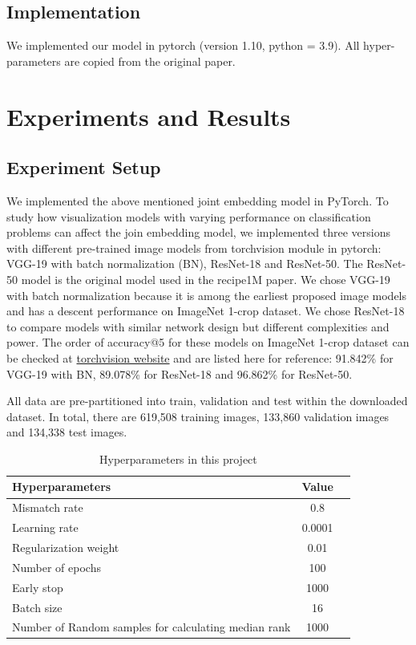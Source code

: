 \documentclass[10pt,twocolumn,letterpaper]{article}
\begin{document}
\subsection{Implementation}
We implemented our model in pytorch (version 1.10, python = 3.9).  All hyper-parameters are copied from the original paper.


\section{Experiments and Results}

\subsection{Experiment Setup}
We implemented the above mentioned joint embedding model in PyTorch.  To study how visualization models with varying performance on classification problems can affect the join embedding model, we implemented three versions with different pre-trained image models from torchvision module in pytorch: VGG-19 with batch normalization (BN), ResNet-18 and ResNet-50.  The ResNet-50 model is the original model used in the recipe1M paper.  We chose VGG-19 with batch normalization because it is among the earliest proposed image models and has a descent performance on ImageNet 1-crop dataset.  We chose ResNet-18 to compare models with similar network design but different complexities and power.  The order of accuracy@5 for these models on ImageNet 1-crop dataset can be checked at \href{https://pytorch.org/vision/stable/models.html}{torchvision website} and are listed here for reference: 91.842\% for VGG-19 with BN, 89.078\% for ResNet-18 and 96.862\% for ResNet-50.

All data are pre-partitioned into train, validation and test within the downloaded dataset.  In total, there are 619,508 training images, 133,860 validation images and 134,338 test images.

\begin{table}
\begin{center}
\begin{tabular}{|l|c|p{8cm}|}
\hline
Hyperparameters & Value \\
\hline\hline
Mismatch rate & 0.8 \\
Learning rate & 0.0001 \\
Regularization weight & 0.01 \\
Number of epochs & 100 \\
Early stop & 1000 \\
Batch size & 16 \\
Number of Random samples for calculating median rank & 1000 \\
\hline
\end{tabular}
\end{center}
\caption{Hyperparameters in this project}
\label{tab:hyperparams}
\end{table}
\end{document}
